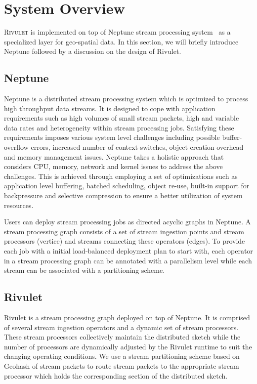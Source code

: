 \section{System Overview}
\label{sec:system}
\textsc{Rivulet} is implemented on top of Neptune stream processing system~\cite{buddhika2016neptune} as a specialized layer for geo-spatial data.
In this section, we will briefly introduce Neptune followed by a discussion on the design of Rivulet.

\subsection{Neptune}
Neptune is a distributed stream processing system which is optimized to process high throughput data streams.
It is designed to cope with application requirements such as high volumes of small stream packets, high and variable data rates and heterogeneity within stream processing jobs.
Satisfying these requirements imposes various system level challenges including possible buffer-overflow errors, increased number of context-switches, object creation overhead and memory management issues.
Neptune takes a holistic approach that considers CPU, memory, network and kernel issues to address the above challenges.
This is achieved through employing a set of optimizations such as application level buffering, batched scheduling, object re-use, built-in support for backpressure and selective compression to ensure a better utilization of system resources.

Users can deploy stream processing jobs as directed acyclic graphs in Neptune.
A stream processing graph consists of a set of stream ingestion points and stream processors (vertice) and streams connecting these operators (edges).
To provide each job with a initial load-balanced deployment plan to start with, each operator in a stream processing graph can be annotated with a parallelism level while each stream can be associated with a partitioning scheme.

\subsection{Rivulet}
Rivulet is a stream processing graph deployed on top of Neptune.
It is comprised of several stream ingestion operators and a dynamic set of stream processors.
These stream processors collectively maintain the distributed sketch while the number of processors are dynamically adjusted by the Rivulet runtime to suit the changing operating conditions.
We use a stream partitioning scheme based on Geohash of stream packets to route stream packets to the appropriate stream processor which holds the corresponding section of the distributed sketch.

